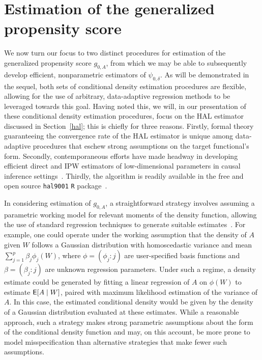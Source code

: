 \section{Estimation of the generalized propensity score}\label{methods}

We now turn our focus to two distinct procedures for estimation of the
generalized propensity score $g_{0,A}$, from which we may be able to
subsequently develop efficient, nonparametric estimators of $\psi_{0,\delta}$.
As will be demonstrated in the sequel, both sets of conditional density
estimation procedures are flexible, allowing for the use of arbitrary,
data-adaptive regression methods to be leveraged towards this goal. Having noted
this, we will, in our presentation of these conditional density estimation
procedures, focus on the HAL estimator discussed in Section~\ref{hal}; this is
chiefly for three reasons. Firstly, formal theory guaranteeing the convergence
rate of the HAL estimator is unique among data-adaptive procedures that eschew
strong assumptions on the target functional's form. Secondly, contemporaneous
efforts have made headway in developing efficient direct and IPW estimators of
low-dimensional parameters in causal inference
settings~\citep{vdl2019efficient,ertefaie2020nonparametric}. Thirdly, the
algorithm is readily available in the free and open source \texttt{hal9001}
\texttt{R} package~\citep{coyle2020hal9001-rpkg, hejazi2020hal9001-joss}.

In considering estimation of $g_{0,A}$, a straightforward strategy involves
assuming a parametric working model for relevant moments of the density
function, allowing the use of standard regression techniques to generate
suitable estimates~\citep{robins2000marginal,
hirano2004propensity,imai2004causal}. For example, one could operate under the
working assumption that the density of $A$ given $W$ follows a Gaussian
distribution with homoscedastic variance and mean $\sum_{j=1}^p \beta_j
\phi_j(W)$, where $\phi = (\phi_j : j)$ are user-specified basis functions and
$\beta = (\beta_j : j)$ are unknown regression parameters. Under such a regime,
a density estimate could be generated by fitting a linear regression of $A$ on
$\phi(W)$ to estimate $\mathsf{E}[A \mid W]$, paired with maximum likelihood estimation
of the variance of $A$. In this case, the estimated conditional density would be
given by the density of a Gaussian distribution evaluated at these estimates.
While a reasonable approach, such a strategy makes strong parametric assumptions
about the form of the conditional density function and may, on this account, be
more prone to model misspecification than alternative strategies that make fewer
such assumptions.

